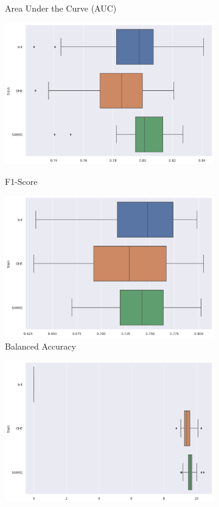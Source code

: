 \documentclass{article}
\theoremstyle{definition}
\begin{document}
\begin{figure}[H]
\begin{subfigure}[b]{0.24\textwidth}
         \caption{Area Under the Curve (AUC)}
         \quad
         \includegraphics[width=\textwidth]{imgs/Adults/Imb/Boxplot_F1S.png}
         \caption{F1-Score}
         \quad
         \includegraphics[width=\textwidth]{imgs/Adults/Imb/Boxplot_BACC.png}
         \caption{Balanced Accuracy}
         \label{Prediction_Adults_Imb2}
     \end{subfigure}
     \hfill
     \begin{subfigure}[b]{0.24\textwidth}
         \centering
         \includegraphics[width=\textwidth]{imgs/Adults/Bal/Boxplot_MC.png}

\end{subfigure}
\end{figure}
\end{document}
